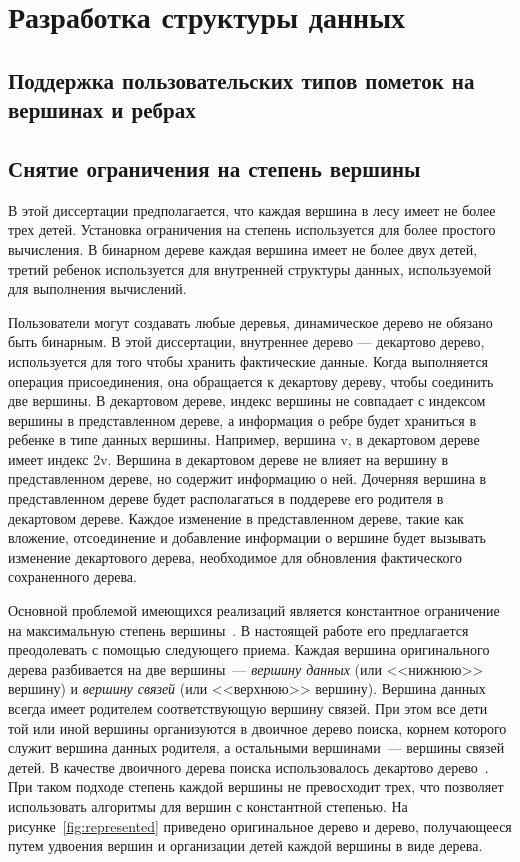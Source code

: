 \documentclass[specification,annotation]{itmo-student-thesis}
\begin{document}
\chapter{Разработка структуры данных}

\section{Поддержка пользовательских типов пометок на вершинах и ребрах}

\section{Снятие ограничения на степень вершины}

В этой диссертации предполагается, что каждая вершина в лесу имеет не более трех детей. Установка ограничения на степень используется для более простого 
вычисления. В бинарном дереве каждая вершина имеет не более двух детей, третий ребенок используется для внутренней структуры данных, используемой для 
выполнения вычислений.

Пользователи могут создавать любые деревья, динамическое дерево не обязано быть бинарным. В этой диссертации, внутреннее дерево --- декартово дерево, 
используется для того чтобы хранить фактические данные. Когда выполняется операция присоединения, она обращается к декартову дереву, чтобы соединить две 
вершины. В декартовом дереве, индекс вершины не совпадает с индексом вершины в представленном дереве, а информация о ребре будет храниться в ребенке в типе 
данных вершины. Например, вершина v, в декартовом дереве имеет индекс 2v. Вершина в декартовом дереве не влияет на вершину в представленном дереве, но 
содержит информацию о ней. Дочерняя вершина в представленном дереве будет располагаться в поддереве его родителя в декартовом дереве. Каждое изменение в 
представленном дереве, такие как вложение, отсоединение и добавление информации о вершине будет вызывать изменение декартового дерева, необходимое для 
обновления фактического сохраненного дерева.

Основной проблемой имеющихся реализаций является константное ограничение на максимальную степень вершины~\cite{acar04}. В настоящей работе его предлагается преодолевать
с помощью следующего приема. Каждая вершина оригинального дерева разбивается на две вершины~--- \emph{вершину данных} (или <<нижнюю>> вершину) и \emph{вершину связей} (или <<верхнюю>> вершину).
Вершина данных всегда имеет родителем соответствующую вершину связей. При этом все дети той или иной вершины организуются в двоичное дерево поиска, корнем которого служит вершина данных родителя, а
остальными вершинами~--- вершины связей детей. В качестве двоичного дерева поиска использовалось декартово дерево~\cite{cartesian-tree}. При таком подходе степень каждой вершины не превосходит трех, что
позволяет использовать алгоритмы для вершин с константной степенью. На рисунке~\ref{fig:represented} приведено оригинальное дерево и дерево, получающееся путем удвоения вершин и организации детей каждой
вершины в виде дерева.
\end{document}
